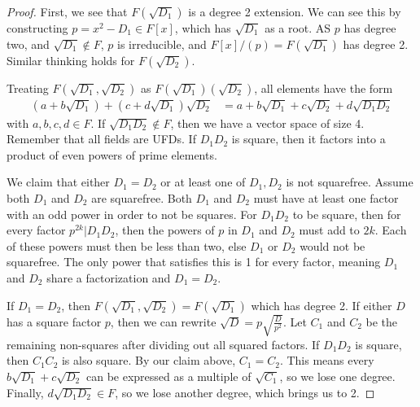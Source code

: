 \documentclass[12pt]{article}
\begin{document}
\begin{proof}
First, we see that $F(\sqrt{D_1})$ is a degree 2 extension. We can see this by constructing $p = x^2 - D_1 \in F[x]$, which has $\sqrt{D_1}$ as a root. AS $p$ has degree two, and $\sqrt{D_1} \notin F$, $p$ is irreducible, and $F[x] / (p) = F(\sqrt{D_1})$ has degree 2. Similar thinking holds for $F(\sqrt{D_2})$.

\noindent Treating $F(\sqrt{D_1}, \sqrt{D_2})$ as $F(\sqrt{D_1})(\sqrt{D_2})$, all elements have the form
\begin{align*}
(a + b\sqrt{D_1}) + (c + d\sqrt{D_1})\sqrt{D_2} &= a + b\sqrt{D_1} + c\sqrt{D_2} + d\sqrt{D_1 D_2}
\end{align*}
with $a,b,c,d \in F$. If $\sqrt{D_1 D_2} \notin F$, then we have a vector space of size 4. Remember that all fields are UFDs. If $D_1 D_2$ is square, then it factors into a product of even powers of prime elements. 

We claim that either $D_1 = D_2$ or at least one of $D_1, D_2$ is not squarefree. Assume both $D_1$ and $D_2$ are squarefree. Both $D_1$ and $D_2$ must have at least one factor with an odd power in order to not be squares. For $D_1D_2$ to be square, then for every factor $p^{2k} | D_1D_2$, then the powers of $p$ in $D_1$ and $D_2$ must add to $2k$. Each of these powers must then be less than two, else $D_1$ or $D_2$ would not be squarefree. The only power that satisfies this is 1 for every factor, meaning $D_1$ and $D_2$ share a factorization and $D_1 = D_2$.

If $D_1 = D_2$, then $F(\sqrt{D_1}, \sqrt{D_2}) = F(\sqrt{D_1})$ which has degree 2. If either $D$ has a square factor $p$, then we can rewrite $\sqrt{D} = p\sqrt{\frac{D}{p^2}}$. Let $C_1$ and $C_2$ be the remaining non-squares after dividing out all squared factors. If $D_1D_2$ is square, then $C_1C_2$ is also square. By our claim above, $C_1 = C_2$. This means every $b \sqrt{D_1} + c\sqrt{D_2}$ can be expressed as a multiple of $\sqrt{C_1}$, so we lose one degree. Finally, $d \sqrt{D_1 D_2} \in F$, so we lose another degree, which brings us to 2.
\end{proof}
\end{document}
